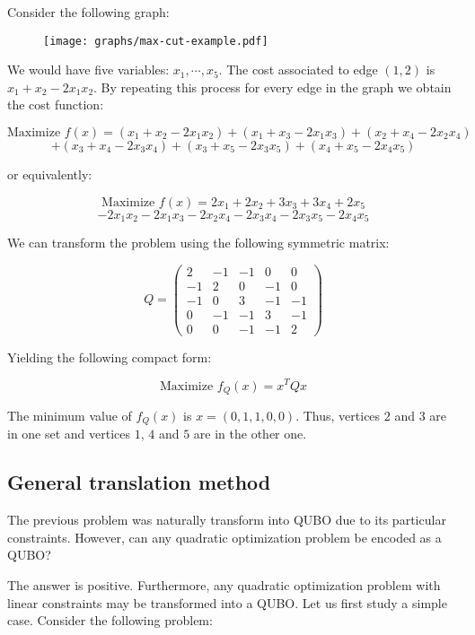 

Consider the following graph:

\begin{figure}[H]
	\texttt{[image: graphs/max-cut-example.pdf]}
	\centering
\end{figure}

We would have five variables: $x_1, \cdots, x_5$. The cost associated to edge $(1,2)$ is $x_1 + x_2 - 2 x_1 x_2$. By repeating this process for every edge in the graph we obtain the cost function:

$$ \text{Maximize  } f(x) = (x_1 + x_2 - 2 x_1 x_2) + (x_1 + x_3 - 2 x_1 x_3) + (x_2 + x_4 - 2 x_2 x_4) $$
$$ +(x_3 + x_4 - 2 x_3 x_4) + (x_3 + x_5 - 2 x_3 x_5) + (x_4 + x_5 - 2 x_4 x_5) $$

or equivalently:

$$ \text{Maximize  } f(x) = 2x_1 + 2x_2 + 3x_3 + 3x_4 + 2x_5$$ 
$$ - 2x_1x_2 - 2x_1x_3 - 2x_2x_4 - 2x_3x_4 - 2x_3x_5 - 2x_4x_5 $$

We can transform the problem using the following symmetric matrix:

$$
	Q = 
	\begin{pmatrix}
	2 & -1 & -1 & 0 & 0 \\
	-1 & 2 & 0 & -1 & 0 \\
	-1 & 0 & 3 & -1 & -1 \\
	0 & -1 & -1 & 3 & -1 \\
	0 & 0 & -1 & -1 & 2
	\end{pmatrix}
$$

Yielding the following compact form:

$$ \text{Maximize  } f_Q(x) = x^T Q x$$ 

The minimum value of $f_Q(x)$ is $x = (0, 1, 1, 0, 0)$. Thus, vertices $2$ and $3$ are in one set and vertices $1$, $4$ and $5$ are in the other one.


\subsection{General translation method}


The previous problem was naturally transform  into QUBO due to its particular constraints. However, can any quadratic optimization problem be encoded as a QUBO?

The answer is positive. Furthermore, any quadratic optimization problem with linear constraints may be transformed into a QUBO. Let us first study a simple case. Consider the following problem:

